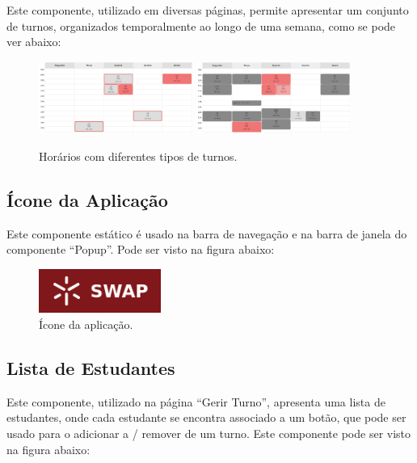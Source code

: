 \documentclass[12pt, a4paper]{article}
\begin{document}
Este componente, utilizado em diversas páginas, permite apresentar um conjunto de turnos,
organizados temporalmente ao longo de uma semana, como se pode ver abaixo:

\begin{figure}[H]
    \centering
    \includegraphics[width=0.45\textwidth]{res/components/schedule-1.png}
    \includegraphics[width=0.45\textwidth]{res/components/schedule-2.png}
    \caption{Horários com diferentes tipos de turnos.}
    \label{schedule}
\end{figure}

\subsection{Ícone da Aplicação}

Este componente estático é usado na barra de navegação e na barra de janela do componente ``Popup''.
Pode ser visto na figura abaixo:

\begin{figure}[H]
    \centering
    \includegraphics[width=4cm]{res/components/application-icon.png}
    \caption{Ícone da aplicação.}
    \label{application-icon}
\end{figure}

\subsection{Lista de Estudantes}

Este componente, utilizado na página ``Gerir Turno'', apresenta uma lista de estudantes, onde cada
estudante se encontra associado a um botão, que pode ser usado para o adicionar a / remover de um
turno. Este componente pode ser visto na figura abaixo:
\end{document}
